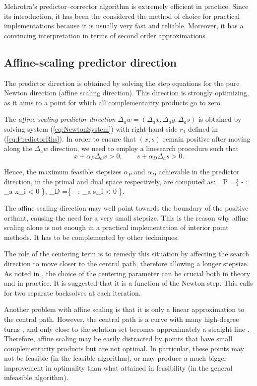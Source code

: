 Mehrotra's predictor--corrector algorithm \cite{Mehrotra92,LustigMarstenShanno}
is extremely efficient in practice. Since its introduction, it has 
been the considered the method of choice for practical implementations 
because it is usually very fast and reliable. Moreover, it has a 
convincing interpretation in terms of second order approximations.

%
%
\subsection{Affine-scaling predictor direction}

The predictor direction is obtained by solving the step equations 
for the pure Newton direction (affine scaling direction). This 
direction is strongly optimizing, as it aims to a point for which 
all complementarity products go to zero. 

The {\em affine-scaling predictor direction} 
$\Delta_a w = (\Delta_a x, \Delta_a y, \Delta_a s)$ is obtained by solving 
system (\ref{eq:NewtonSystem}) with right-hand side $r_1$ defined 
in (\ref{eq:PredictorRhs}).
In order to ensure that $(x,s)$ remain positive after moving along the
$\Delta_a w$ direction, we need to employ a linesearch procedure such that
\[
  x + \alpha_P \Delta_a x > 0, \qquad  s + \alpha_D \Delta_a s > 0.
\]

Hence, the maximum feasible stepsizes $\alpha_P$ and $\alpha_D$ achievable
in the predictor direction, in the primal and dual space respectively, 
are computed as:
\be
  \alpha_P =\min \left\{ - : \Delta_a x_i < 0 \right\},
  \quad\;
  \alpha_D =\min \left\{ - : \Delta_a s_i < 0 \right\}.
\ee

The affine scaling direction may well point towards the boundary 
of the positive orthant, causing the need for a very small stepsize. 
This is the reason why affine scaling alone is not enough in a 
practical implementation of interior point methods. It has to be 
complemented by other techniques.

The role of the centering term is to remedy this situation by 
affecting the search direction to move closer to the central path, 
therefore allowing a longer stepsize. 
As noted in \cite{TapiaZhangSaltzmanWeiser}, the choice of the 
centering parameter can be crucial both in theory and in practice. 
It is suggested that it is a function of the Newton step. 
This calls for two separate backsolves at each iteration.

Another problem with affine scaling is that it is only a linear 
approximation to the central path. However, the central path is a curve
with many high-degree turns \cite{VavasisYe}, and only close to the 
solution set becomes approximately a straight line \cite{Megiddo}. 
Therefore, affine scaling may be easily distracted by points that 
have small complementarity products but are not optimal. In particular, 
these points may not be feasible (in the feasible algorithm), or 
may produce a much bigger improvement in optimality than what 
attained in feasibility (in the general infeasible algorithm).

